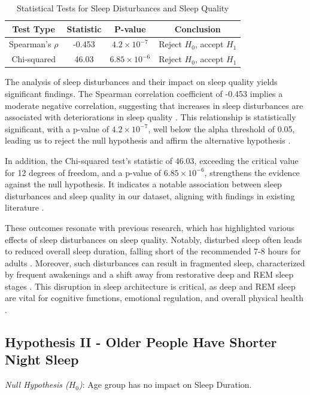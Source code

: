 \documentclass[conference]{IEEEtran}
\begin{document}
\begin{table}[ht]
    \centering
    \caption{Statistical Tests for Sleep Disturbances and Sleep Quality}
    \label{tab:hypothesis1}
    \begin{tabular}{|c|c|c|c|}
        \hline
        \textbf{Test Type}  & \textbf{Statistic} & \textbf{P-value}        & \textbf{Conclusion}            \\
        \hline
        Spearman's \(\rho\) & -0.453             & \(4.2 \times 10^{-7}\)  & Reject \(H_0\), accept \(H_1\)
        \\
        \hline
        Chi-squared         & 46.03              & \(6.85 \times 10^{-6}\) & Reject \(H_0\), accept \(H_1\)
        \\
        \hline
    \end{tabular}
\end{table}
The analysis of sleep disturbances and their impact on sleep quality yields significant findings. The Spearman correlation coefficient of -0.453 implies a moderate negative correlation, suggesting that increases in sleep disturbances are associated with deteriorations in sleep quality \cite{alhola2007sleep}. This relationship is statistically significant, with a p-value of \(4.2 \times 10^{-7}\), well below the alpha threshold of 0.05, leading us to reject the null hypothesis and affirm the alternative hypothesis \cite{morin2003cognitive}.

In addition, the Chi-squared test's statistic of 46.03, exceeding the critical value for 12 degrees of freedom, and a p-value of \(6.85 \times 10^{-6}\), strengthens the evidence against the null hypothesis. It indicates a notable association between sleep disturbances and sleep quality in our dataset, aligning with findings in existing literature \cite{riemann2014pharmacological}.

These outcomes resonate with previous research, which has highlighted various effects of sleep disturbances on sleep quality. Notably, disturbed sleep often leads to reduced overall sleep duration, falling short of the recommended 7-8 hours for adults \cite{morin2003cognitive}. Moreover, such disturbances can result in fragmented sleep, characterized by frequent awakenings and a shift away from restorative deep and REM sleep stages \cite{alhola2007sleep}. This disruption in sleep architecture is critical, as deep and REM sleep are vital for cognitive functions, emotional regulation, and overall physical health \cite{riemann2014pharmacological}.

\subsection*{Hypothesis II - Older People Have Shorter Night Sleep}
\textit{Null Hypothesis (\(H_0\))}: Age group has no impact on Sleep Duration.
\end{document}
